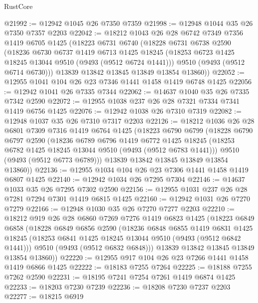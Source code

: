\begin{lexlean}{RustCore}
\begin{coremodule}
@21992 := @12942 @1045 @26 @7350 @7359
@21998 := @12948 @1044 @35 @26 @7350 @7357 @2203
@22042 := @18212
    @1043
    @26
    @28
    @6742
    @7349
    @7356
    @1419
    @6705
    @1425
    (@18223
      @6731
      @6740
      (@18228
        @6731
        @6738
        @2590
        (@18236
          @6730
          @6737
          @1419
          @6713
          @1425
          @18245
          (@18253 @6723 @1425 @18245 @13044 @9510 (@9493 (@9512 @6724 @1441)))
          @9510
          (@9493 (@9512 @6714 @6730)))
        @13839
        @13842
        @13845
        @13849
        @13854
        @13860))
@22052 := @12955 @1041 @104 @26 @23 @7346 @1441 @1458 @1419 @6748 @1425
@22056 := @12942 @1041 @26 @7335 @7344
@22062 := @14637 @1040 @35 @26 @7335 @7342 @2590
@22072 := @12955 @1038 @237 @26 @28 @7321 @7334 @7341 @1419 @6756 @1425
@22076 := @12942 @1038 @26 @7310 @7319
@22082 := @12948 @1037 @35 @26 @7310 @7317 @2203
@22126 := @18212
    @1036
    @26
    @28
    @6801
    @7309
    @7316
    @1419
    @6764
    @1425
    (@18223
      @6790
      @6799
      (@18228
        @6790
        @6797
        @2590
        (@18236
          @6789
          @6796
          @1419
          @6772
          @1425
          @18245
          (@18253 @6782 @1425 @18245 @13044 @9510 (@9493 (@9512 @6783 @1441)))
          @9510
          (@9493 (@9512 @6773 @6789)))
        @13839
        @13842
        @13845
        @13849
        @13854
        @13860))
@22136 := @12955 @1034 @104 @26 @23 @7306 @1441 @1458 @1419 @6807 @1425
@22140 := @12942 @1034 @26 @7295 @7304
@22146 := @14637 @1033 @35 @26 @7295 @7302 @2590
@22156 := @12955 @1031 @237 @26 @28 @7281 @7294 @7301 @1419 @6815 @1425
@22160 := @12942 @1031 @26 @7270 @7279
@22166 := @12948 @1030 @35 @26 @7270 @7277 @2203
@22210 := @18212
    @919
    @26
    @28
    @6860
    @7269
    @7276
    @1419
    @6823
    @1425
    (@18223
      @6849
      @6858
      (@18228
        @6849
        @6856
        @2590
        (@18236
          @6848
          @6855
          @1419
          @6831
          @1425
          @18245
          (@18253 @6841 @1425 @18245 @13044 @9510 (@9493 (@9512 @6842 @1441)))
          @9510
          (@9493 (@9512 @6832 @6848)))
        @13839
        @13842
        @13845
        @13849
        @13854
        @13860))
@22220 := @12955 @917 @104 @26 @23 @7266 @1441 @1458 @1419 @6866 @1425
@22222 := @18183 @7255 @7264
@22225 := @18188 @7255 @7262 @2590
@22231 := @18195 @7241 @7254 @7261 @1419 @6874 @1425
@22233 := @18203 @7230 @7239
@22236 := @18208 @7230 @7237 @2203
@22277 := @18215
    @6919

\end{coremodule}
\end{lexlean}
